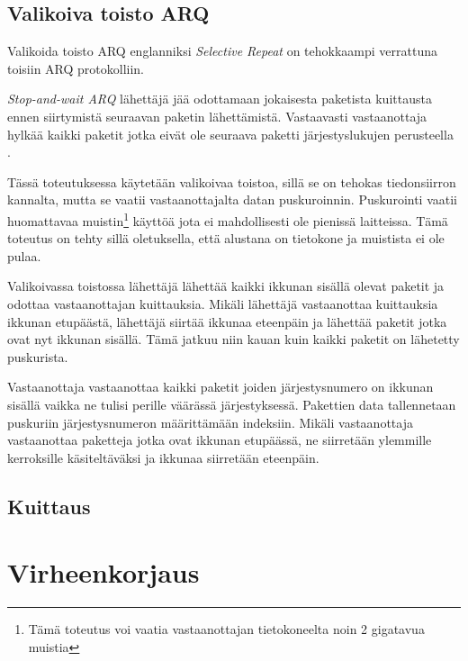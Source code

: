 \documentclass[a4paper,12pt]{article}
\begin{document}
    \subsection{Valikoiva toisto ARQ}\label{subsec:valikoiva_toisto}
    Valikoida toisto ARQ englanniksi \textit{Selective Repeat} on tehokkaampi verrattuna toisiin ARQ protokolliin. 

    \begin{framed}
       \textit{Stop-and-wait ARQ} lähettäjä jää odottamaan jokaisesta paketista kuittausta ennen siirtymistä seuraavan paketin lähettämistä. Vastaavasti vastaanottaja hylkää kaikki paketit jotka eivät ole seuraava paketti järjestyslukujen perusteella \cite{StopAndWaitARQ}. 
    \end{framed}

    Tässä toteutuksessa käytetään valikoivaa toistoa, sillä se on tehokas tiedonsiirron kannalta, mutta se vaatii vastaanottajalta datan puskuroinnin. Puskurointi vaatii huomattavaa muistin\footnote{Tämä toteutus voi vaatia vastaanottajan tietokoneelta noin 2 gigatavua muistia} käyttöä jota ei mahdollisesti ole pienissä laitteissa. Tämä toteutus on tehty sillä oletuksella, että alustana on tietokone ja muistista ei ole pulaa.\par 

    Valikoivassa toistossa lähettäjä lähettää kaikki ikkunan sisällä olevat paketit ja odottaa vastaanottajan kuittauksia. Mikäli lähettäjä vastaanottaa kuittauksia ikkunan etupäästä, lähettäjä siirtää ikkunaa eteenpäin ja lähettää paketit jotka ovat nyt ikkunan sisällä. Tämä jatkuu niin kauan kuin kaikki paketit on lähetetty puskurista. \par 

    Vastaanottaja vastaanottaa kaikki paketit joiden järjestysnumero on ikkunan sisällä vaikka ne tulisi perille väärässä järjestyksessä. Pakettien data tallennetaan puskuriin järjestysnumeron määrittämään indeksiin. Mikäli vastaanottaja vastaanottaa paketteja jotka ovat ikkunan etupäässä, ne siirretään ylemmille kerroksille käsiteltäväksi ja ikkunaa siirretään eteenpäin.    


    \subsection{Kuittaus}\label{subsec:kuittaus}

    \section{Virheenkorjaus}\label{sec:virheenkorjaus}
    \blindtext
\end{document}

